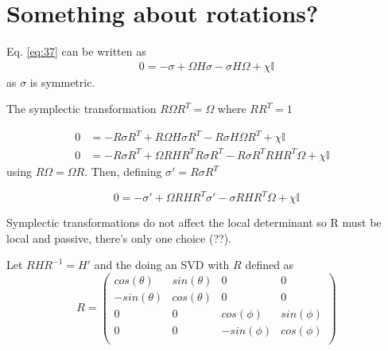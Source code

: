 \documentclass[11pt,a4paper]{article}
\numberwithin{equation}{section}
\begin{document}
	
 	\iffalse
	\section{Something about rotations?}
	 
	Eq. \ref{eq:37} can be written as
	\begin{align*} 
	0 = -\sigma + \Omega H\sigma -\sigma H\Omega + \chi \mathbb{I} 
	\end{align*} as $\sigma$ is symmetric. 
	
	The symplectic transformation $R\Omega R^{T} = \Omega$ where $RR^{T}=1$

	\begin{align*} 
	0 &= -R\sigma R^{T} + R\Omega H\sigma R^{T} - R\sigma H\Omega R^{T} + \chi \mathbb{I}&\\
	0 &= -R\sigma R^{T} + \Omega R H R^T R \sigma R^{T} - R\sigma R^{T} RH R^T\Omega + \chi \mathbb{I}& 
	\end{align*}	using $R\Omega = \Omega R$. Then, defining $\sigma' = R\sigma R^T$
	
	\begin{equation*} 
	0 = -\sigma' + \Omega R H R^T \sigma' - \sigma RH R^T\Omega + \chi \mathbb{I}
	\end{equation*}
	
	Symplectic transformations do not affect the local determinant so R must be local and passive, there's only one choice (??).
	
	Let $RHR^{-1} = H'$ and the doing an SVD with $R$ defined as
	\begin{equation*}
	R = \begin{pmatrix}
	cos(\theta) & sin(\theta) & 0 & 0\\
	-sin(\theta) & cos(\theta) & 0 & 0\\
	0 & 0 & cos(\phi) & sin(\phi) \\
	0 & 0 & -sin(\phi) & cos(\phi)\\
	\end{pmatrix}
	\end{equation*}
\end{document}
